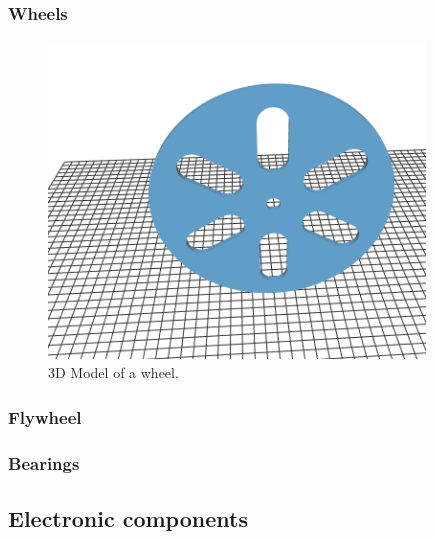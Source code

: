 \subsubsection{Wheels}
\begin{figure}[H]
    \centering
    \includegraphics[width=10cm]{img/components/wheel.png}
    \caption{3D Model of a wheel.}
    \label{fig:Mass plot}
\end{figure}
\subsubsection{Flywheel}
\subsubsection{Bearings}
\subsection{Electronic components}
